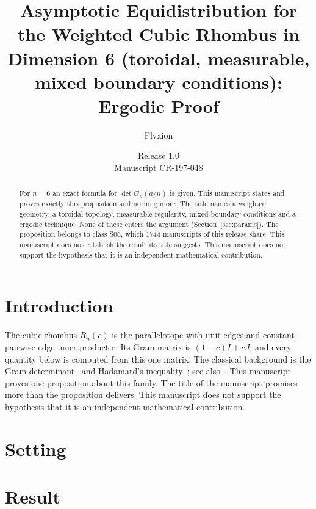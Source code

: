 \documentclass[11pt]{article}
\title{Asymptotic Equidistribution for the Weighted Cubic Rhombus in Dimension 6 (toroidal, measurable, mixed boundary conditions): Ergodic Proof}
\author{Flyxion}
\date{Release 1.0\\ Manuscript CR-197-048}
\begin{document}
\maketitle
\begin{abstract}
For $n=6$ an exact formula for $\det G_n(a/n)$ is given. This manuscript states and proves exactly this proposition and nothing more. The title names a weighted geometry, a toroidal topology, measurable regularity, mixed boundary conditions and a ergodic technique. None of these enters the argument (Section~\ref{sec:params}). The proposition belongs to class S06, which 1744 manuscripts of this release share. This manuscript does not establish the result its title suggests. This manuscript does not support the hypothesis that it is an independent mathematical contribution.
\end{abstract}

\section{Introduction}
The cubic rhombus $R_n(c)$ is the parallelotope with unit edges and constant pairwise edge inner product $c$. Its Gram matrix is $(1-c)I+cJ$, and every quantity below is computed from this one matrix. The classical background is the Gram determinant~\cite{gram} and Hadamard's inequality~\cite{hadamard}; see also~\cite{hj}.
This manuscript proves one proposition about this family. The title of the manuscript promises more than the proposition delivers. This manuscript does not support the hypothesis that it is an independent mathematical contribution.

\section{Setting}


\section{Result}

\end{document}
